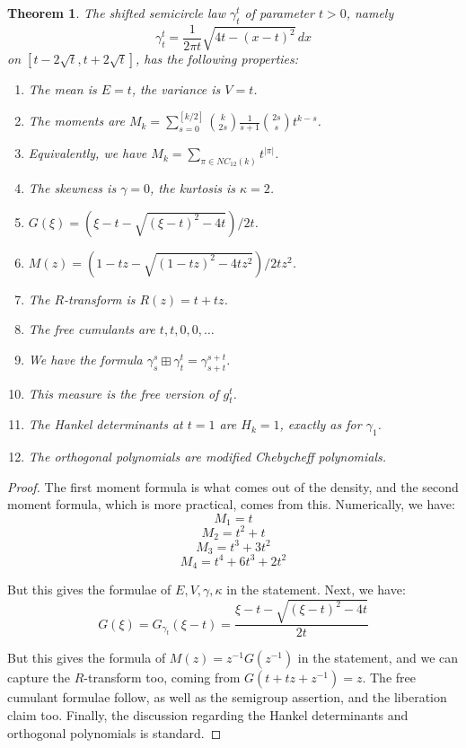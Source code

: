 \documentclass[12pt]{amsbook}
\newtheorem{theorem}{Theorem}[chapter]
\begin{document}
\begin{theorem}
The shifted semicircle law $\gamma_t^t$ of parameter $t>0$, namely
$$\gamma_t^t=\frac{1}{2\pi t}\sqrt{4t-(x-t)^2}\,dx$$
on $[t-2\sqrt{t},t+2\sqrt{t}]$, has the following properties:
\begin{enumerate}
\item The mean is $E=t$, the variance is $V=t$.

\item The moments are $M_k=\sum_{s=0}^{[k/2]}\binom{k}{2s}\frac{1}{s+1}\binom{2s}{s}t^{k-s}$.

\item Equivalently, we have $M_k=\sum_{\pi\in NC_{12}(k)}t^{|\pi|}$.

\item The skewness is $\gamma=0$, the kurtosis is $\kappa=2$.

\item $G(\xi)=(\xi-t-\sqrt{(\xi-t)^2-4t})/2t$.

\item $M(z)=(1-tz-\sqrt{(1-tz)^2-4tz^2})/2tz^2$.

\item The $R$-transform is $R(z)=t+tz$.

\item The free cumulants are $t,t,0,0,\ldots$

\item We have the formula $\gamma_s^s\boxplus\gamma_t^t=\gamma_{s+t}^{s+t}$.

\item This measure is the free version of $g_t^t$.

\item The Hankel determinants at $t=1$ are $H_k=1$, exactly as for $\gamma_1$.

\item The orthogonal polynomials are modified Chebycheff polynomials.
\end{enumerate}
\end{theorem}

\begin{proof}
The first moment formula is what comes out of the density, and the second moment formula, which is more practical, comes from this. Numerically, we have:
$$M_1=t$$
$$M_2=t^2+t$$
$$M_3=t^3+3t^2$$
$$M_4=t^4+6t^3+2t^2$$

But this gives the formulae of $E,V,\gamma,\kappa$ in the statement. Next, we have:
$$G(\xi)=G_{\gamma_t}(\xi-t)=\frac{\xi-t-\sqrt{(\xi-t)^2-4t}}{2t}$$ 

But this gives the formula of $M(z)=z^{-1}G(z^{-1})$ in the statement, and we can capture the $R$-transform too, coming from $G(t+tz+z^{-1})=z$. The free cumulant formulae follow, as well as the semigroup assertion, and the liberation claim too. Finally, the discussion regarding the Hankel determinants and orthogonal polynomials is standard.
\end{proof}
\end{document}

